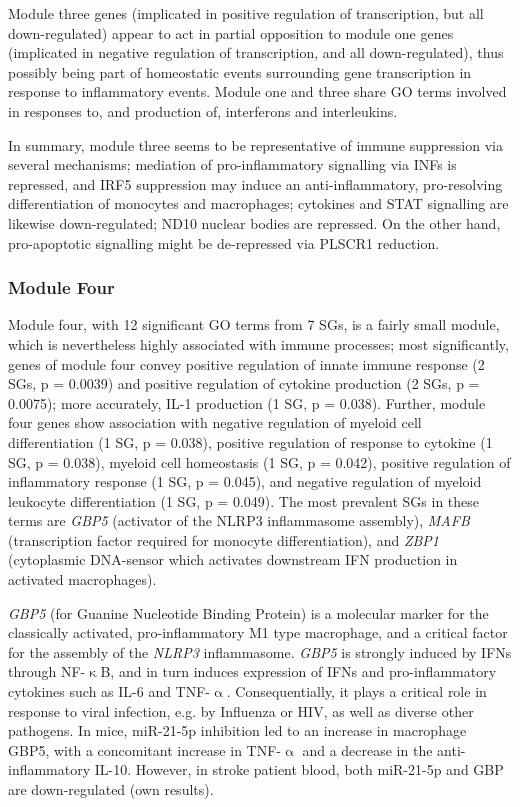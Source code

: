 Module three genes (implicated in positive regulation of transcription, but all down-regulated) appear to act in partial opposition to module one genes (implicated in negative regulation of transcription, and all down-regulated), thus possibly being part of homeostatic events surrounding gene transcription in response to inflammatory events. Module one and three share GO terms involved in responses to, and production of, interferons and interleukins.

In summary, module three seems to be representative of immune suppression via several mechanisms; mediation of pro-inflammatory signalling via INFs is repressed, and IRF5 suppression may induce an anti-inflammatory, pro-resolving differentiation of monocytes and macrophages; cytokines and STAT signalling are likewise down-regulated; ND10 nuclear bodies are repressed. On the other hand, pro-apoptotic signalling might be de-repressed via PLSCR1 reduction. 

\subsubsection{Module Four}
Module four, with 12 significant GO terms from 7 SGs, is a fairly small module, which is nevertheless highly associated with immune processes; most significantly, genes of module four convey positive regulation of innate immune response (2 SGs, p = 0.0039) and positive regulation of cytokine production (2 SGs, p = 0.0075); more accurately, IL-1 production (1 SG, p = 0.038). Further, module four genes show association with negative regulation of myeloid cell differentiation (1 SG, p = 0.038), positive regulation of response to cytokine (1 SG, p = 0.038), myeloid cell homeostasis (1 SG, p = 0.042), positive regulation of inflammatory response (1 SG, p = 0.045), and negative regulation of myeloid leukocyte differentiation (1 SG, p = 0.049). The most prevalent SGs in these terms are \emph{GBP5} (activator of the NLRP3 inflammasome assembly), \emph{MAFB} (transcription factor required for monocyte differentiation), and \emph{ZBP1} (cytoplasmic DNA-sensor which activates downstream IFN production in activated macrophages).

\emph{GBP5} (for Guanine Nucleotide Binding Protein) is a molecular marker for the classically activated, pro-inflammatory M1 type macrophage,\cite{Fujiwara2016} and a critical factor for the assembly of the \emph{NLRP3} inflammasome.\cite{Shenoy2012} \emph{GBP5} is strongly induced by IFNs through NF-$\upkappa$B, and in turn induces expression of IFNs and pro-inflammatory cytokines such as IL-6 and TNF-$\upalpha$.\cite{Feng2017} Consequentially, it plays a critical role in response to viral infection, e.g. by Influenza or HIV, as well as diverse other pathogens.\cite{Feng2017,Krapp2016} In mice, miR-21-5p inhibition led to an increase in macrophage GBP5, with a concomitant increase in TNF-$\upalpha$ and a decrease in the anti-inflammatory IL-10.\cite{Corsetti2018} However, in stroke patient blood, both miR-21-5p and GBP are down-regulated (own results).

